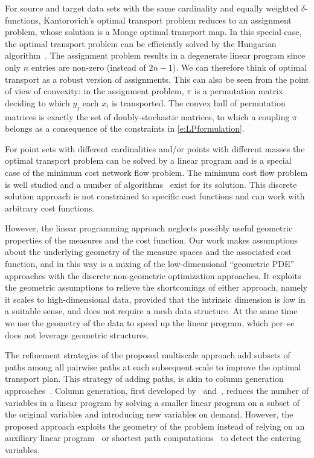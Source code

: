 \documentclass[twoside,11pt]{article}
\newcommand{\coupling}[0]{\pi}
\begin{document}
For source and target data sets with the same cardinality and equally weighted
$\delta$-functions, Kantorovich's optimal transport problem reduces to
an assignment problem, whose solution is a Monge optimal transport map. In this
special case, the optimal transport problem can be efficiently solved by the
Hungarian algorithm~\citep{kuhn:nrlq1955}. The assignment problem results in
a degenerate linear program since only $n$ entries are non-zero (instead of
$2n-1$). We can therefore think of optimal transport as a robust version of
assignments. This can also be seen from the point of view of convexity: in the
assignment problem, $\coupling$ is a permutation matrix deciding to which $y_j$
each $x_i$ is transported. The convex hull of permutation matrices is exactly
the set of doubly-stochastic matrices, to which a coupling $\pi$ belongs as a
consequence of the constraints in \eqref{e:LPformulation}.

For point sets with different cardinalities and/or points with different masses
the optimal transport problem can be solved by a linear program and is a
special case of the minimum cost network flow problem. The minimum cost flow
problem is well studied and a number of
algorithms~\citep{ford:ms1956,klein:ms1967,
cunningham:mp1976,goldberg:stoc1987,bertsekas:or1988,orlin:mp1997} exist for
its solution. This discrete solution approach is not constrained to specific
cost functions and can work with arbitrary cost functions.

However, the linear programming approach neglects possibly useful geometric
properties of the measures and the cost function.  Our work makes
assumptions about the underlying geometry of the measure spaces and the
associated cost function, and in this way is a mixing of the low-dimensional
``geometric PDE'' approaches with the discrete non-geometric optimization
approaches. It exploits the geometric assumptions to relieve the shortcomings
of either approach, namely it scales to high-dimensional data, provided that
the intrinsic dimension is low in a suitable sense, and does not require a mesh
data structure. At the same time we use the geometry of the data
to speed up the linear program, which per--se does not leverage geometric
structures.  

The refinement strategies of the proposed multiscale approach add subsets of paths among
all pairwise paths at each subsequent scale to improve the optimal transport
plan. This strategy of adding paths, is akin to column generation
approaches~\citep{desrosiers:book2005}.  Column generation, first developed
by~\citet{dantzig:informs1960} and~\citet{ford:ms1956}, reduces the number of
variables in a linear program by solving a smaller linear program on a subset
of the original variables and introducing new variables on demand. However, the
proposed approach exploits the geometry of the problem instead of relying on an
auxiliary linear program~\citep{dantzig:informs1960} or shortest path
computations~\citep{ford:ms1956} to detect the entering variables.
\end{document}
